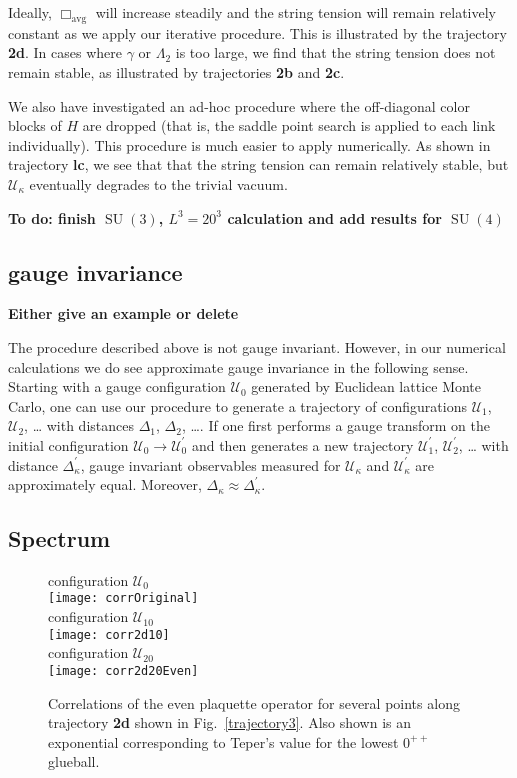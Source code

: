 \documentclass[preprint,aps,prd]{revtex4-2}
\newcommand{\plaquette}{\Box}
\newcommand{\config}{\mathcal{U}}
\DeclareMathOperator{\SU}{SU}
\begin{document}
Ideally, $\plaquette_\mathrm{avg}$ will increase steadily and the string tension will remain relatively constant as we apply our iterative procedure.
This is illustrated by the trajectory {\bf 2d}.
In cases where $\gamma$ or $\Lambda_2$ is too large, we find that the
string tension does not remain stable, as illustrated by
trajectories {\bf 2b} and {\bf 2c}.

We also have investigated an ad-hoc procedure where
the off-diagonal color blocks of $H$ are dropped (that is, the
saddle point search is applied to each link individually).
This procedure is much easier to apply numerically.
As shown in trajectory {\bf lc},
we see that that the string tension can remain relatively stable,
but $\config_\kappa$ eventually degrades to the trivial vacuum.

{\bf  To do:
  finish $\SU(3)$, $L^3=20^3$ calculation and
  add results for $\SU(4)$}

\subsection{gauge invariance}

{\bf Either give an example or delete }

The procedure described above is not gauge invariant.
However, in our numerical calculations we do see approximate
gauge invariance in the following
sense.  Starting with a gauge configuration $\config_0$ generated
by Euclidean lattice Monte Carlo, one can
use our procedure to generate a trajectory of configurations
$\config_1$, $\config_2$, \ldots
with distances $\Delta_1$, $\Delta_2$, \ldots.
If one first performs a gauge transform on the initial
configuration $\config_0 \to \config_0^\prime$ and then generates a
new trajectory $\config_1^\prime$, $\config_2^\prime$, \ldots
with distance $\Delta_\kappa^\prime$,
gauge invariant observables
measured for $\config_\kappa$ and $\config_\kappa^\prime$ are approximately equal.
Moreover,  $\Delta_\kappa \approx \Delta_\kappa^\prime$.


\subsection{Spectrum}

\begin{figure}
   configuration $\config_0$\\
   \texttt{[image: corrOriginal]}\\
   configuration $\config_{10}$\\
   \texttt{[image: corr2d10]}\\
   configuration $\config_{20}$\\
   \texttt{[image: corr2d20Even]}
\caption{Correlations of the even plaquette operator for several points
  along trajectory {\bf 2d} shown in Fig.~\ref{trajectory3}.
  Also shown is an exponential corresponding to Teper's value
  for the lowest $0^{++}$ glueball.
  \label{corr2dEven}}
\end{figure}
\end{document}

